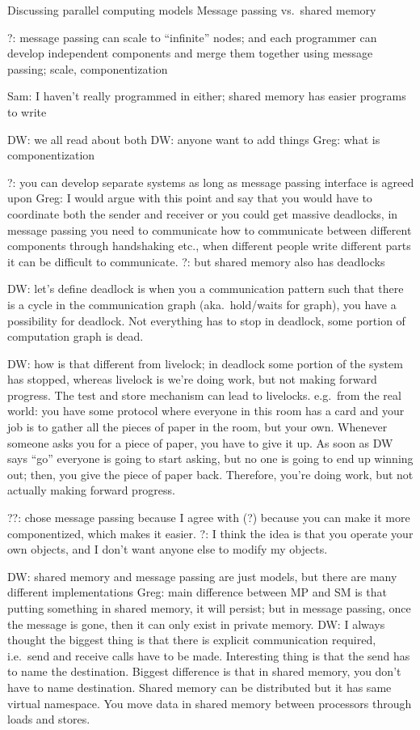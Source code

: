 



Discussing parallel computing models
Message passing vs.\ shared memory

?: message passing can scale to ``infinite'' nodes; and each programmer can develop independent components and merge them together using message passing; scale, componentization

Sam: I haven't really programmed in either; shared memory has easier programs to write

DW: we all read about both
DW: anyone want to add things
Greg: what is componentization

?: you can develop separate systems as long as message passing interface is agreed upon
Greg: I would argue with this point and say that you would have to coordinate both the sender and receiver or you could get massive deadlocks, in message passing you need to communicate how to communicate between different components through handshaking etc., when different people write different parts it can be difficult to communicate. 
?: but shared memory also has deadlocks

DW: let's define deadlock is when you a communication pattern such that there is a cycle in the communication graph (aka.\ hold/waits for graph), you have a possibility for deadlock. Not everything has to stop in deadlock, some portion of computation graph is dead.

DW: how is that different from livelock; in deadlock some portion of the system has stopped, whereas livelock is we're doing work, but not making forward progress. The test and store mechanism can lead to livelocks. e.g.\ from the real world: you have some protocol where everyone in this room has a card and your job is to gather all the pieces of paper in the room, but your own. Whenever someone asks you for a piece of paper, you have to give it up. As soon as DW says ``go'' everyone is going to start asking, but no one is going to end up winning out; then, you give the piece of paper back. Therefore, you're doing work, but not actually making forward progress. 

??: chose message passing because I agree with (?) because you can make it more componentized, which makes it easier.
?: I think the idea is that you operate your own objects, and I don't want anyone else to modify my objects.

DW: shared memory and message passing are just models, but there are many different implementations
Greg: main difference between MP and SM is that putting something in shared memory, it will persist; but in message passing, once the message is gone, then it can only exist in private memory.
DW: I always thought the biggest thing is that there is explicit communication required, i.e.\ send and receive calls have to be made.
Interesting thing is that the send has to name the destination.
Biggest difference is that in shared memory, you don't have to name destination. Shared memory can be distributed but it has same virtual namespace. You move data in shared memory between processors through loads and stores.

